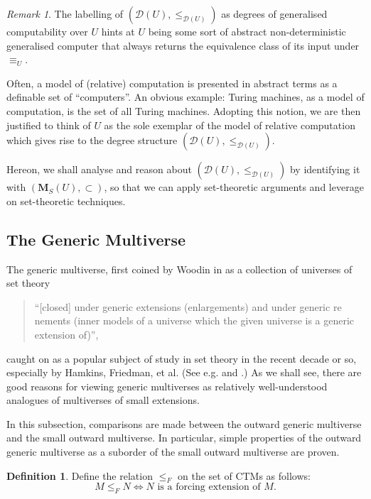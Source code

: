 \documentclass[12pt, twoside]{memoir}
\numberwithin{equation}{section}
\theoremstyle{definition}
\newtheorem{defi}[thm]{Definition}
\theoremstyle{remark}
\newtheorem{rem}[thm]{Remark}
\theoremstyle{definition}
\theoremstyle{definition}
\theoremstyle{definition}
\theoremstyle{remark}
\begin{document}
\begin{rem}\label{rem9112}
The labelling of $(\mathcal{D}(U), \leq_{\mathcal{D}(U)})$ as degrees of generalised computability over $U$ hints at $U$ being some sort of abstract non-deterministic generalised computer that always returns the equivalence class of its input under $\equiv_U$. 

Often, a model of (relative) computation is presented in abstract terms as a definable set of ``computers''. An obvious example: Turing machines, as a model of computation, is the set of all Turing machines. Adopting this notion, we are then justified to think of $U$ as the sole exemplar of the model of relative computation which gives rise to the degree structure $(\mathcal{D}(U), \leq_{\mathcal{D}(U)})$.
\end{rem}

Hereon, we shall analyse and reason about $(\mathcal{D}(U), \leq_{\mathcal{D}(U)})$ by identifying it with $(\mathbf{M}_S(U), \subset)$, so that we can apply set-theoretic arguments and leverage on set-theoretic techniques.

\subsection{The Generic Multiverse}\label{genmul}

The generic multiverse, first coined by Woodin in \cite{woodingen} as a collection of universes of set theory 
\begin{quote}
    ``[closed] under generic extensions (enlargements) and under generic re nements (inner models of a universe which the given universe is a generic extension of)'',
\end{quote}
caught on as a popular subject of study in set theory in the recent decade or so, especially by Hamkins, Friedman, et al. (See e.g. \cite{hamkinsmoving} and \cite{sygeneric}.) As we shall see, there are good reasons for viewing generic multiverses as relatively well-understood analogues of multiverses of small extensions.

In this subsection, comparisons are made between the outward generic multiverse and the small outward multiverse. In particular, simple properties of the outward generic multiverse as a suborder of the small outward multiverse are proven.

\begin{defi}
Define the relation $\leq_F$ on the set of CTMs as follows:
\begin{equation*}
    M \leq_F N \iff N \text{ is a forcing extension of } M \text{.}
\end{equation*}
\end{defi}
\end{document}
